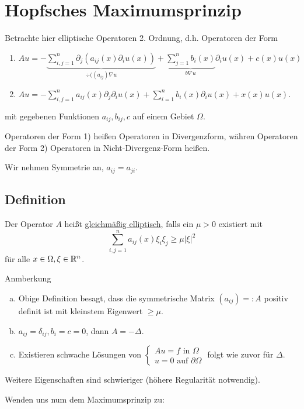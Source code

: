 \section{Hopfsches Maximumsprinzip}

Betrachte hier elliptische Operatoren 2. Ordnung, d.h. Operatoren der Form

\begin{enumerate}[1)]
  \item $Au = - \underbrace{\sum_{i,j = 1}^n \partial_j\left(a_{ij}(x) \partial_i u(x)\right)}_{\div((a_{ij})\nabla u} + \underbrace{\sum_{j = 1}^n b_i(x)}_{b \nabla u} \partial_i u(x) + c(x) u(x)$
  \item $Au = - \sum_{i,j = 1}^n a_{ij}(x) \partial_j \partial_i u(x) + \sum_{i = 1}^n b_i(x) \partial_i u(x) + x(x) u(x)$.
\end{enumerate}
mit gegebenen Funktionen $a_{ij}, b_{ij}, c$ auf einem Gebiet $\Omega$.

Operatoren der Form 1) heißen Operatoren in  Divergenzform, währen Operatoren der Form 2) Operatoren in Nicht-Divergenz-Form heißen.

Wir nehmen Symmetrie an, $a_{ij} = a_{ji}$.

\subsection{Definition}

Der Operator $A$ heißt \underline{gleichmäßig elliptisch}, falls ein $\mu > 0 $ existiert mit
$$
\sum_{i,j = 1}^n a_{ij}(x) \xi_i \xi_j \geq \mu |\xi|^2
$$
für alle $x \in \Omega, \xi \in \mathbb{R}^n$.

Anmberkung
\begin{enumerate}[a)]
  \item Obige Definition besagt, dass die symmetrische Matrix $(a_{ij}) =: A$ positiv definit ist mit kleinstem Eigenwert $\geq \mu$.
  \item $a_{ij} = \delta_{ij}, b_i = c = 0$, dann $A = -\Delta$.
  \item Existieren schwache Lösungen von $\begin{cases} Au = f \text{ in } \Omega \\ u = 0 \text{ auf } \partial \Omega\end{cases}$ folgt wie zuvor für $\Delta$.
\end{enumerate}

Weitere Eigenschaften sind schwieriger (höhere Regularität notwendig).

Wenden uns num dem Maximumsprinzip zu:

